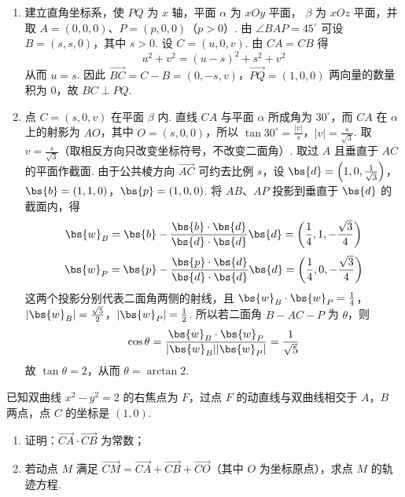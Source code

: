 \begin{solution}
\begin{enumerate}
\item 建立直角坐标系，使 \(PQ\) 为 \(x\) 轴，平面 \(\alpha\) 为 \(xOy\) 平面，
\(\beta\) 为 \(xOz\) 平面，并取 \(A=(0,0,0)\)、\(P=(p,0,0)\)（\(p>0\)）.
由 \(\angle BAP=45^\circ\) 可设 \(B=(s,s,0)\)，其中 \(s>0\).
设 \(C=(u,0,v)\). 由 \(CA=CB\) 得
\[
u^2+v^2=(u-s)^2+s^2+v^2
\]
从而 \(u=s\). 因此
\(\overrightarrow{BC}=C-B=(0,-s,v)\)，\(\overrightarrow{PQ}=(1,0,0)\)
两向量的数量积为 \(0\)，故 \(BC\perp PQ\).
\item 点 \(C=(s,0,v)\) 在平面 \(\beta\) 内. 直线 \(CA\) 与平面 \(\alpha\) 所成角为
\(30^\circ\)，而 \(CA\) 在 \(\alpha\) 上的射影为 \(AO\)，其中
\(O=(s,0,0)\)，所以
\(\tan30^\circ=\frac{|v|}{s}\)，\(|v|=\frac{s}{\sqrt3}\).
取 \(v=\frac{s}{\sqrt3}\)（取相反方向只改变坐标符号，不改变二面角）.
取过 \(A\) 且垂直于 \(AC\) 的平面作截面. 由于公共棱方向
\(\overrightarrow{AC}\) 可约去比例 \(s\)，设
\(\bs{d}=\left(1,0,\frac1{\sqrt3}\right)\)，\(\bs{b}=(1,1,0)\)，\(\bs{p}=(1,0,0)\).
将 \(AB\)、\(AP\) 投影到垂直于 \(\bs{d}\) 的截面内，得
\[
\bs{w}_B=\bs{b}-\frac{\bs{b}\cdot\bs{d}}{\bs{d}\cdot\bs{d}}\bs{d}
=\left(\frac14,1,-\frac{\sqrt3}{4}\right)
\]
\[
\bs{w}_P=\bs{p}-\frac{\bs{p}\cdot\bs{d}}{\bs{d}\cdot\bs{d}}\bs{d}
=\left(\frac14,0,-\frac{\sqrt3}{4}\right)
\]
这两个投影分别代表二面角两侧的射线，且
\(\bs{w}_B\cdot\bs{w}_P=\frac14\)，\(|\bs{w}_B|=\frac{\sqrt5}{2}\)，\(|\bs{w}_P|=\frac12\).
所以若二面角 \(B-AC-P\) 为 \(\theta\)，则
\[
\cos\theta=\frac{\bs{w}_B\cdot\bs{w}_P}{|\bs{w}_B||\bs{w}_P|}
=\frac1{\sqrt5}
\]
故 \(\tan\theta=2\)，从而
\(\theta=\arctan 2\).
\end{enumerate}
\end{solution}

\begin{problem}
已知双曲线 \(x^{2} - y^{2} = 2\) 的右焦点为 \(F\)，过点 \(F\) 的动直线与双曲线相交于 \(A\)，\(B\) 两点，点 \(C\) 的坐标是 \((1, 0)\).

\begin{enumerate}
\item 证明：\(\overrightarrow{CA} \cdot \overrightarrow{CB}\) 为常数；

\item 若动点 \(M\) 满足 \(\overrightarrow{CM} = \overrightarrow{CA} + \overrightarrow{CB} + \overrightarrow{CO}\)（其中 \(O\) 为坐标原点），求点 \(M\) 的轨迹方程.
\end{enumerate}
\end{problem}

